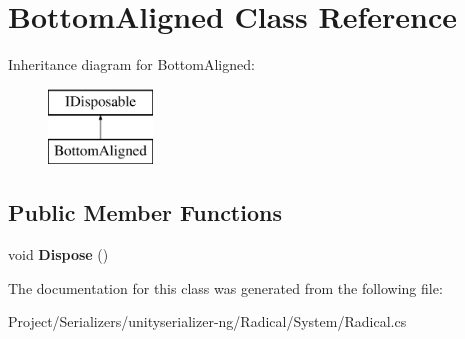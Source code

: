 \hypertarget{class_bottom_aligned}{}\section{Bottom\+Aligned Class Reference}
\label{class_bottom_aligned}
Inheritance diagram for Bottom\+Aligned\+:\begin{figure}[H]
\begin{center}
\leavevmode
\includegraphics[height=2.000000cm]{class_bottom_aligned}
\end{center}
\end{figure}
\subsection*{Public Member Functions}
\begin{DoxyCompactItemize}
\item 
\mbox{\label{class_bottom_aligned_adcb96199970f967c2a4672830ba19508}} 
void {\bfseries Dispose} ()
\end{DoxyCompactItemize}


The documentation for this class was generated from the following file\+:\begin{DoxyCompactItemize}
\item 
Project/\+Serializers/unityserializer-\/ng/\+Radical/\+System/Radical.\+cs\end{DoxyCompactItemize}
